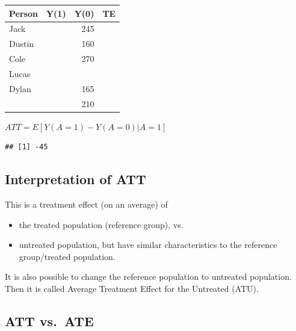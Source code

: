 \documentclass[
]{book}
\newenvironment{Shaded}{\begin{snugshade}}{\end{snugshade}}
\newcommand{\FunctionTok}[1]{\textcolor[rgb]{0.00,0.00,0.00}{#1}}
\newcommand{\NormalTok}[1]{#1}
\newcommand{\SpecialCharTok}[1]{\textcolor[rgb]{0.00,0.00,0.00}{#1}}
\providecommand{\tightlist}{%
  \setlength{\itemsep}{0pt}\setlength{\parskip}{0pt}}
\begin{document}
\begin{tabular}{llrr}
\toprule
Person & Y(1) & Y(0) & TE\\
\midrule
Jack &  & 245 & \\
Dustin &  & 160 & \\
Cole &  & 270 & \\
Lucas\cellcolor[HTML]{D7261E}{\textcolor{white}{\textbf{}}} & \cellcolor[HTML]{D7261E}{\textcolor{white}{\textbf{}}} & \cellcolor[HTML]{D7261E}{\textcolor{white}{\textbf{210}}} & \cellcolor[HTML]{D7261E}{\textcolor{white}{\textbf{}}}\\
Dylan &  & 165 & \\
\addlinespace
 &  & 210 & \\
\bottomrule
\end{tabular}

\(ATT = E[Y(A=1)-Y(A=0) | A = 1]\)

\begin{Shaded}
\end{Shaded}

\begin{verbatim}
## [1] -45
\end{verbatim}

\hypertarget{interpretation-of-att}{%
\subsection{Interpretation of ATT}\label{interpretation-of-att}}

This is a treatment effect (on an average) of

\begin{itemize}
\tightlist
\item
  the treated population (reference group), vs.
\item
  untreated population, but have similar characteristics to the reference group/treated population.
\end{itemize}

It is also possible to change the reference population to untreated population. Then it is called Average Treatment Effect for the Untreated (ATU).

\hypertarget{att-vs.-ate}{%
\subsection{ATT vs.~ATE}\label{att-vs.-ate}}
\end{document}
